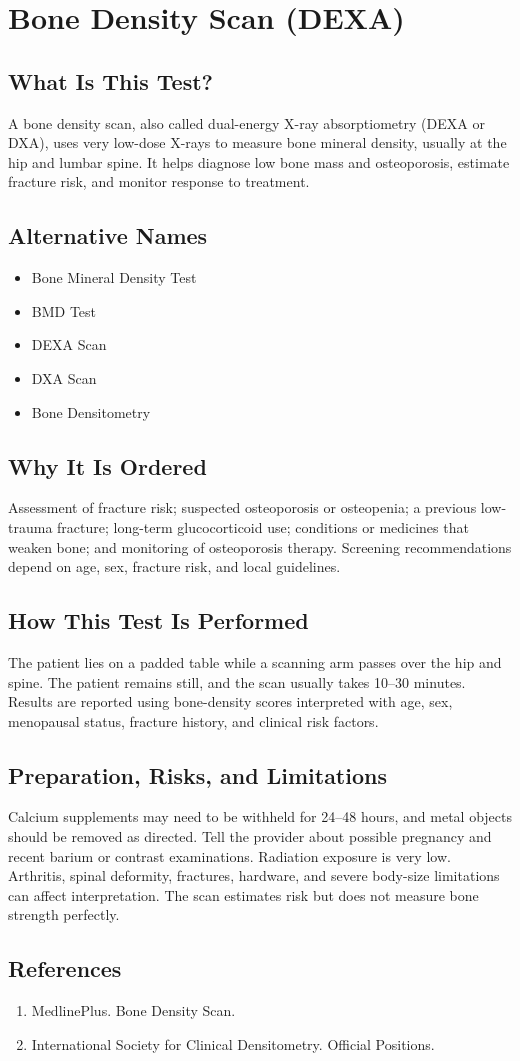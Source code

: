 \chapter{Bone Density Scan (DEXA)}

\section*{What Is This Test?}
A bone density scan, also called dual-energy X-ray absorptiometry (DEXA or DXA), uses very low-dose X-rays to measure bone mineral density, usually at the hip and lumbar spine. It helps diagnose low bone mass and osteoporosis, estimate fracture risk, and monitor response to treatment.

\section*{Alternative Names}
\begin{itemize}
  \item Bone Mineral Density Test
  \item BMD Test
  \item DEXA Scan
  \item DXA Scan
  \item Bone Densitometry
\end{itemize}
\section*{Why It Is Ordered}
Assessment of fracture risk; suspected osteoporosis or osteopenia; a previous low-trauma fracture; long-term glucocorticoid use; conditions or medicines that weaken bone; and monitoring of osteoporosis therapy. Screening recommendations depend on age, sex, fracture risk, and local guidelines.

\section*{How This Test Is Performed}
The patient lies on a padded table while a scanning arm passes over the hip and spine. The patient remains still, and the scan usually takes 10--30 minutes. Results are reported using bone-density scores interpreted with age, sex, menopausal status, fracture history, and clinical risk factors.

\section*{Preparation, Risks, and Limitations}
Calcium supplements may need to be withheld for 24--48 hours, and metal objects should be removed as directed. Tell the provider about possible pregnancy and recent barium or contrast examinations. Radiation exposure is very low. Arthritis, spinal deformity, fractures, hardware, and severe body-size limitations can affect interpretation. The scan estimates risk but does not measure bone strength perfectly.

\section*{References}
\begin{enumerate}
  \item MedlinePlus. Bone Density Scan.
  \item International Society for Clinical Densitometry. Official Positions.
\end{enumerate}

\clearpage
